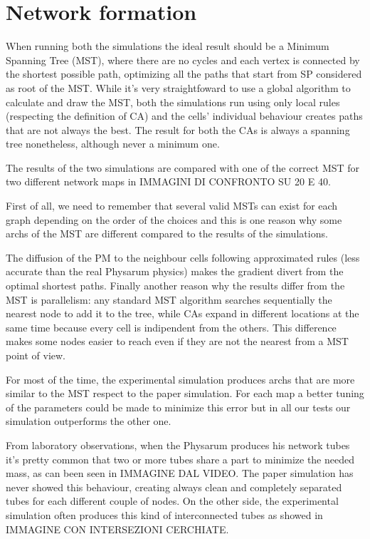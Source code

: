 \section{Network formation}

When running both the simulations the ideal result should be a Minimum Spanning Tree (MST), where there are no cycles and each vertex is connected by the shortest possible path, optimizing all the paths that start from SP considered as root of the MST.
While it's very straightfoward to use a global algorithm to calculate and draw the MST, both the simulations run using only local rules (respecting the definition of CA) and the cells' individual behaviour creates paths that are not always the best. The result for both the CAs is always a spanning tree nonetheless, although never a minimum one.

\par
The results of the two simulations are compared with one of the correct MST for two different network maps in IMMAGINI DI CONFRONTO SU 20 E 40. 

\par
First of all, we need to remember that several valid MSTs can exist for each graph depending on the order of the choices and this is one reason why some archs of the MST are different compared to the results of the simulations.

\par
The diffusion of the PM to the neighbour cells following approximated rules (less accurate than the real Physarum physics) makes the gradient divert from the optimal shortest paths.
Finally another reason why the results differ from the MST is parallelism: any standard MST algorithm searches sequentially the nearest node to add it to the tree, while CAs expand in different locations at the same time because every cell is indipendent from the others. This difference makes some nodes easier to reach even if they are not the nearest from a MST point of view.

\par
For most of the time, the experimental simulation produces archs that are more similar to the MST respect to the paper simulation. For each map a better tuning of the parameters could be made to minimize this error but in all our tests our simulation outperforms the other one.

\par
From laboratory observations, when the Physarum produces his network tubes it's pretty common that two or more tubes share a part to minimize the needed mass, as can been seen in IMMAGINE DAL VIDEO. The paper simulation has never showed this behaviour, creating always clean and completely separated tubes for each different couple of nodes. On the other side, the experimental simulation often produces this kind of interconnected tubes as showed in IMMAGINE CON INTERSEZIONI CERCHIATE.

